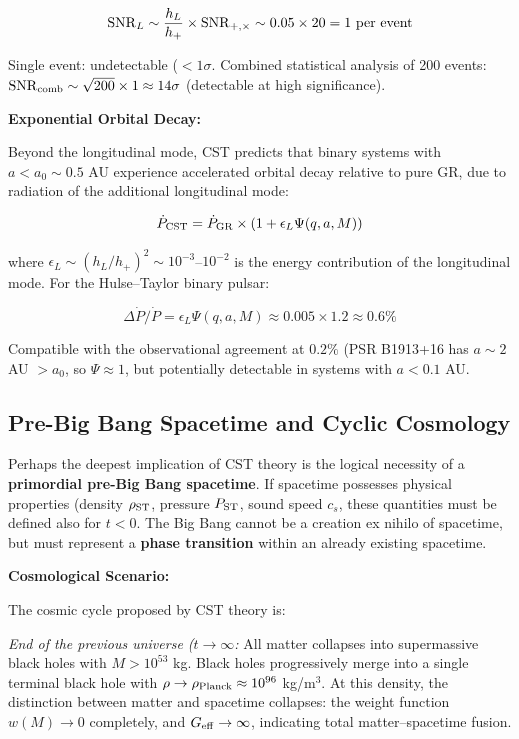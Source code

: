 \documentclass[11pt,a4paper]{article}
\begin{document}
\[{\rm SNR}_L \sim \frac{h_L}{h_+} \times {\rm SNR}_{+,\times} \sim 0.05 \times 20 = 1~{\rm per~event}\]

Single event: undetectable (\(< 1\sigma\). Combined statistical
analysis of 200 events:
\({\rm SNR}_{\rm comb} \sim \sqrt{200} \times 1 \approx 14\sigma\)
(detectable at high significance).

\textbf{Exponential Orbital Decay:}

Beyond the longitudinal mode, CST predicts that binary systems with
\(a < a_0 \sim 0.5\) AU experience accelerated orbital decay relative to
pure GR, due to radiation of the additional longitudinal mode:

\[\dot{P}_{\rm CST} = \dot{P}_{\rm GR} \times \left(1 + \epsilon_L \Psi(q,a,M)\right)\]

where \(\epsilon_L \sim (h_L/h_+)^2 \sim 10^{-3}\)--\(10^{-2}\) is the
energy contribution of the longitudinal mode. For the Hulse--Taylor \cite{Hulse1975}
binary pulsar:

\[\Delta\dot{P}/\dot{P} = \epsilon_L \Psi(q,a,M) \approx 0.005 \times 1.2 \approx 0.6\%\]

Compatible with the observational agreement at \(0.2\%\) (PSR B1913+16
has \(a \sim 2\) AU \(> a_0\), so \(\Psi \approx 1\), but potentially
detectable in systems with \(a < 0.1\) AU.

\hypertarget{pre-big-bang-spacetime-and-cyclic-cosmology}{%
\subsection{Pre-Big Bang Spacetime and Cyclic
Cosmology}\label{pre-big-bang-spacetime-and-cyclic-cosmology}}

Perhaps the deepest implication of CST theory is the logical necessity
of a \textbf{primordial pre-Big Bang spacetime}. If spacetime possesses
physical properties (density \(\rho_{\rm ST}\), pressure \(P_{\rm ST}\),
sound speed \(c_s\), these quantities must be defined also for
\(t < 0\). The Big Bang cannot be a creation ex nihilo of spacetime, but
must represent a \textbf{phase transition} within an already existing
spacetime.

\textbf{Cosmological Scenario:}

The cosmic cycle proposed by CST theory is:

\emph{End of the previous universe (\(t \to \infty\):} All matter
collapses into supermassive black holes with \(M > 10^{53}\) kg. Black
holes progressively merge into a single terminal black hole with
\(\rho \to \rho_{\rm Planck} \approx 10^{96}\) kg/m$^{3}$. At this density,
the distinction between matter and spacetime collapses: the weight
function \(w(M) \to 0\) completely, and \(G_{\rm eff} \to \infty\),
indicating total matter--spacetime fusion.
\end{document}
